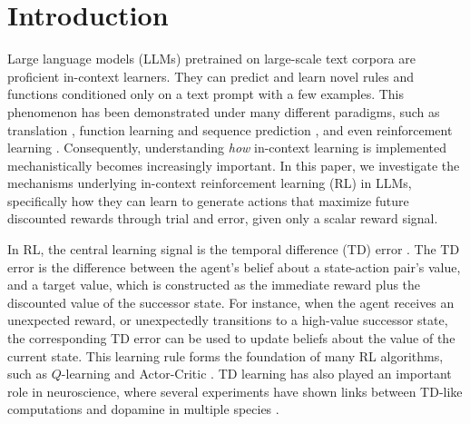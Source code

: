\documentclass{article} %
\begin{document}
\section{Introduction}


Large language models (LLMs) pretrained on large-scale text corpora are proficient in-context learners. They can predict and learn novel rules and functions conditioned only on a text prompt with a few examples. This phenomenon has been demonstrated under many different paradigms, such as translation \citep{brown2020language, wei_emergent_2022}, function learning and sequence prediction \citep{garg2022can, coda2023meta}, and even reinforcement learning \citep{binz_using_2023, shinn2024reflexion, brooks2022context, schubert2024context, hayes2024large}. Consequently, understanding \emph{how} in-context learning is implemented mechanistically becomes increasingly important. In this paper, we investigate the mechanisms underlying in-context reinforcement learning (RL) in LLMs, specifically how they can learn to generate actions that maximize future discounted rewards through trial and error, given only a scalar reward signal.

In RL, the central learning signal is the temporal difference (TD) error \citep{sutton1988learning}. The TD error is the difference between the agent's belief about a state-action pair's value, and a target value, which is constructed as the immediate reward plus the discounted value of the successor state. For instance, when the agent receives an unexpected reward, or unexpectedly transitions to a high-value successor state, the corresponding TD error can be used to update beliefs about the value of the current state. This learning rule forms the foundation of many RL algorithms, such as $Q$-learning \citep{mnih2015human, watkins1992q} and Actor-Critic \citep{konda1999actor, sutton1999policy, haarnoja2018soft}. TD learning has also played an important role in neuroscience, where several experiments have shown links between TD-like computations and dopamine in multiple species \citep{montague1996framework, schultz_neural_1997, fiorillo2003discrete, flagel2011selective, niv2015reinforcement}.
\end{document}
